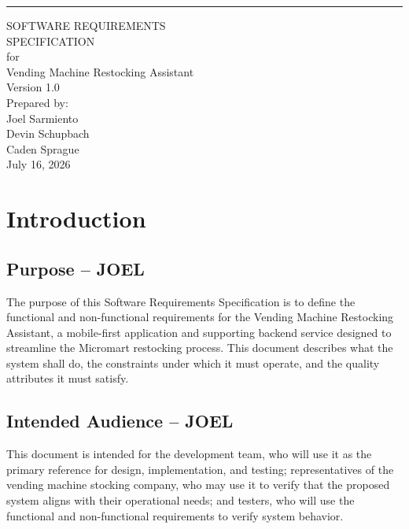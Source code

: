 \documentclass{scrreprt}
\date{}
\def\myversion{1.0 }
\begin{document}
\begin{flushright}
    \rule{16cm}{5pt}\vskip1cm
    \begin{bfseries}
        \Huge{SOFTWARE REQUIREMENTS\\ SPECIFICATION}\\
        \vspace{1.5cm}
        for\\
        \vspace{1.5cm}
        Vending Machine Restocking Assistant\\
        \vspace{1.5cm}
        \LARGE{Version \myversion}\\
        \vspace{1.5cm}
        Prepared by:\\
        Joel Sarmiento\\
        Devin Schupbach\\
        Caden Sprague\\
        \vspace{1.5cm}
        July 16, 2026\\
    \end{bfseries}
\end{flushright}

\tableofcontents

\chapter{Introduction}

\section{Purpose -- JOEL}
The purpose of this Software Requirements Specification is to define the functional and non-functional requirements for the Vending Machine Restocking Assistant, a mobile-first application and supporting backend service designed to streamline the Micromart restocking process. This document describes what the system shall do, the constraints under which it must operate, and the quality attributes it must satisfy.

\section{Intended Audience -- JOEL}
This document is intended for the development team, who will use it as the primary reference for design, implementation, and testing; representatives of the vending machine stocking company, who may use it to verify that the proposed system aligns with their operational needs; and testers, who will use the functional and non-functional requirements to verify system behavior.
\end{document}
